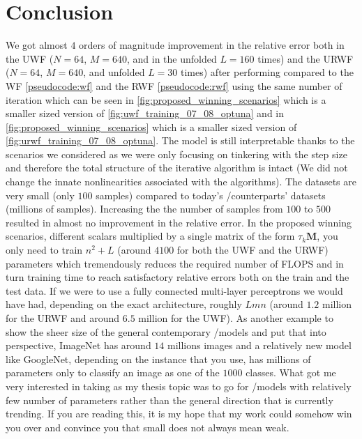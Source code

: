 \chapter{Conclusion}

We got almost $4$ orders of magnitude improvement in the relative error both in the \ac{UWF} ($N=64$, $M=640$, 
and in the unfolded $L=160$ times) and the \ac{URWF} ($N=64$, $M=640$, and unfolded $L=30$ times) after performing 
\ho \cite{Hutter2019}\cite{Akiba2019}\index{\hp} compared to the \ac{WF}\cite{Candes2014} 
\cref{pseudocode:wf} and the \ac{RWF}\cite{Zhang2016} 
\cref{pseudocode:rwf} using the same number of iteration which can be seen in 
\cref{fig:proposed_winning_scenarios} which is a smaller sized version of \cref{fig:uwf_training_07_08_optuna} and 
in \cref{fig:proposed_winning_scenarios} which is a smaller sized version of \cref{fig:urwf_training_07_08_optuna}. The model is still 
interpretable thanks to the scenarios we considered as we were only focusing on tinkering with the step size and therefore 
the total structure of the iterative algorithm is intact (We did not change the innate nonlinearities associated with the algorithms). 
The datasets are very small (only $100$ samples) compared to today's \ml/\dl counterparts' \cite{Krizhevsky2017}\cite{Szegedy2014} 
datasets (millions of samples). Increasing the the number of samples from $100$ to $500$ resulted in almost 
no improvement in the relative error. In the proposed winning scenarios, different scalars multiplied by a single matrix of the 
form $\tau_k\boldsymbol{M}$, you only need to train $n^2+L$ (around $4100$ for both the \ac{UWF} and the \ac{URWF}) 
parameters which tremendously reduces the required number of \ac{FLOPS} and in turn training time to reach satisfactory 
relative errors both on the train and the test data. If we were to use a fully connected multi-layer perceptrons we would have 
had, depending on the exact architecture, roughly $Lmn$ (around $1.2$ million for the \ac{URWF} and around $6.5$ million for 
the \ac{UWF}). As another example to show the sheer size of the general contemporary \ml/\dl models and put that into perspective, 
ImageNet\cite{Deng2009} has around $14$ millions images and a relatively new model 
like GoogleNet\cite{Szegedy2014}, depending on the instance that you use, has millions of parameters 
only to classify an image as one of the $1000$ classes. What got me very interested in taking \du as 
my thesis topic was to go for \ml/\dl models with relatively few number of parameters rather than the general 
direction that is currently trending. If you are reading this, it is my hope that my work could 
somehow win you over and convince you that small does not always mean weak.


